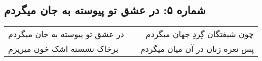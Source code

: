 \begin{center}
\section*{شماره ۵: در عشق تو پیوسته به جان میگردم}
\label{sec:005}
\begin{longtable}{l p{0.5cm} r}
در عشق تو پیوسته به جان میگردم
&&
چون شیفتگان گِردِ جهان میگردم
\\
برخاک نشسته اشک خون میریزم
&&
پس نعره زنان در آن میان میگردم
\\
\end{longtable}
\end{center}
